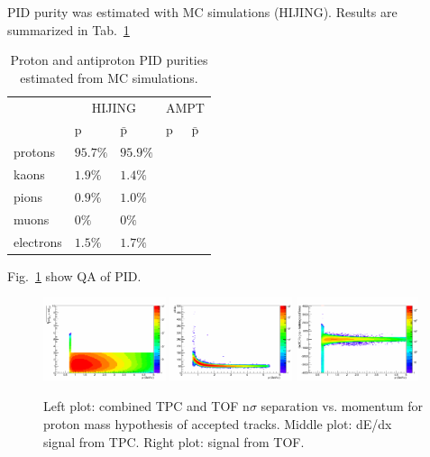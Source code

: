 PID purity was estimated with MC simulations (HIJING). Results are summarized in Tab.~\ref{pidpurities}
\begin{table}[h]
  \begin{tabularx}{\textwidth}{|X|X|X|X|X|} \hline
    \centering
    & \multicolumn{2}{|c|}{HIJING} & \multicolumn{2}{|c|}{AMPT}   \\ \cline{2-5}
    \centering
    &   p &   $\bar{\mathrm{p}}$  &  p &  $\bar{\mathrm{p}}$ \\ \hline
    \centering
    protons &  $95.7\%$ & $95.9\%$  & ~ & ~ \\ \hline
    \centering
    kaons & $1.9\%$ & $1.4\%$  & ~ & ~ \\ \hline
    \centering
    pions & $0.9\%$ & $1.0\%$  & ~ & ~ \\ \hline
    \centering
    muons & $0\%$ & $0\%$  & ~ & ~ \\ \hline
    \centering
    electrons & $1.5\%$ & $1.7\%$  & ~ & ~ \\ \hline

  \end{tabularx}
  \caption{Proton and antiproton PID purities estimated from MC simulations.}
  \label{pidpurities}
\end{table}

Fig.~\ref{tpctofnsigma} show QA of PID.
 \begin{figure}[h!]
   \centering
   \includegraphics[width=0.32\textwidth]{tpctofnsigma}
   \includegraphics[width=0.32\textwidth]{tpcdedx}
   \includegraphics[width=0.32\textwidth]{toftime}
   \caption{Left plot: combined TPC and TOF n$\sigma$ separation vs.  momentum for proton mass hypothesis of accepted tracks. Middle plot: dE/dx signal from TPC. Right plot: signal from TOF.}
   \label{tpctofnsigma}
 \end{figure}

